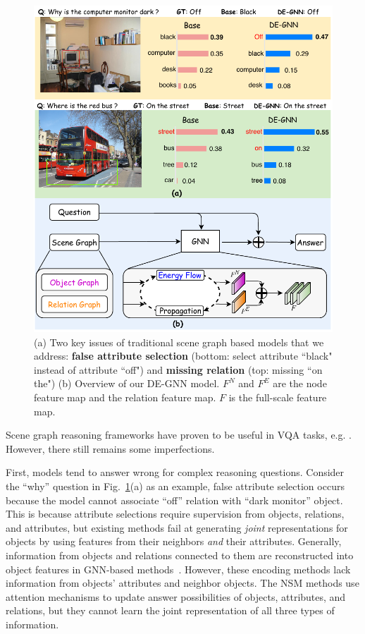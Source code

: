 \documentclass[letterpaper]{article} %
\begin{document}
\begin{figure}[t!]
    \centering 
    \includegraphics[scale=0.6]{./pic/intro5.pdf} 
    \caption{(a) Two key issues of traditional scene graph based models that we address: \textbf{false attribute selection} (bottom: select attribute ``black" instead of attribute ``off") and \textbf{missing relation} (top: missing ``on the") (b) Overview of our DE-GNN model. $F^N$ and $F^E$ are the node feature map and the relation feature map. $F$ is the full-scale feature map.} \label{scene-graph}
    \vspace{-0.11in}
\end{figure}


Scene graph reasoning frameworks have proven to be useful in VQA tasks, e.g. \cite{johnson2015image,yang2020prior}. 
However, there still remains some imperfections. 

First, models tend to answer wrong for complex reasoning questions. 
Consider the ``why'' question in Fig.~\ref{scene-graph}(a) as an example, false attribute selection occurs because the model cannot associate ``off'' relation with ``dark monitor'' object.
This is because attribute selections require supervision from objects, relations, and attributes, but existing methods fail at generating \emph{joint} representations for objects by using features from their neighbors \emph{and} their attributes. 
Generally, information from objects and relations connected to them are reconstructed into object features in GNN-based methods~\cite{xu2019spatial}. However, these encoding methods lack information from objects' attributes and neighbor objects. 
The NSM methods use attention mechanisms to update answer possibilities of objects, attributes, and relations, but they cannot learn the joint representation of all three types of information. 
\end{document}

